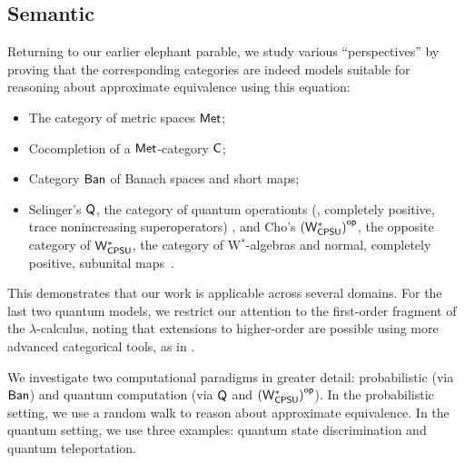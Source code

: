\subsection*{Semantic}

Returning to our earlier elephant parable, we study various “perspectives” by proving that the corresponding categories are indeed models suitable for reasoning about approximate equivalence using this equation:
\begin{itemize}
\item The category of metric spaces $\mathsf{Met}$;
\item Cocompletion of a $\mathsf{Met}$-category $\mathsf{C}$;
\item Category $ \mathsf{Ban} $ of Banach spaces and short maps;
\item Selinger’s \( \mathsf{Q} \), the category of quantum operationts (\ie, completely positive, trace nonincreasing superoperators) \cite{selinger2004towards}, and Cho’s \( \left(\mathsf{W^*_{CPSU}}\right)^{\mathsf{op}} \), the opposite category of \( \mathsf{W^*_{CPSU}} \), the category of W$^*$-algebras and normal, completely positive, subunital maps~\cite{choSemanticsQuantumProgramming2016}.
\end{itemize}
This demonstrates that our work is applicable across several domains. For the last two quantum models, we restrict our attention to the first-order fragment of the $\lambda$-calculus, noting that extensions to higher-order are possible using more advanced categorical tools, as in \cite{dahlqvist2023syntactic}.

We investigate two computational paradigms in greater detail: probabilistic (via $\mathsf{Ban}$) and quantum computation (via $\mathsf{Q}$ and $\left(\mathsf{W^*_{CPSU}}\right)^{\mathsf{op}}$). In the probabilistic setting, we use a random walk to reason about approximate equivalence. In the quantum setting, we use three examples: quantum state discrimination and quantum teleportation.
 



